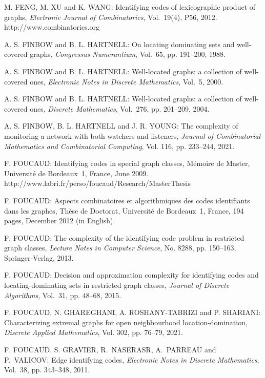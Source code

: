 \begin{thebibliography}{999}
M. FENG, M. XU and K. WANG: Identifying codes of lexicographic product of graphs, {\it Electronic Journal of Combinatorics}, Vol.~19(4), P56, 2012.\\
http://www.combinatorics.org

A. S. FINBOW and B. L. HARTNELL: On locating dominating sets and well-covered graphs, {\it Congressus Numerantium}, Vol.~65, pp. 191--200, 1988.

A. S. FINBOW and B. L. HARTNELL: Well-located graphs: a collection of well-covered ones, {\it Electronic Notes in Discrete Mathematics}, Vol.~5, 2000.

A. S. FINBOW and B. L. HARTNELL: Well-located graphs: a collection of well-covered ones, {\it Discrete Mathematics}, Vol.~276, pp. 201--209, 2004.

A. S. FINBOW, B. L. HARTNELL and J. R. YOUNG: The complexity of monitoring a network with both watchers and listeners, {\it Journal of Combinatorial Mathematics and Combinatorial Computing}, Vol. 116, pp. 233--244, 2021.

F. FOUCAUD: Identifying codes in special graph classes, M\'emoire de Master, Universit\'e de Bordeaux~1, France, June 2009.\\http://www.labri.fr/perso/foucaud/Research/MasterThesis

F. FOUCAUD: Aspects combinatoires et algorithmiques des codes identifiants dans les graphes, Th\`ese de Doctorat, Universit\'e de Bordeaux~1, France, 194 pages, December 2012 (in English).

F. FOUCAUD: The complexity of the  identifying code problem in restricted graph classes, {\it Lecture Notes in Computer Science}, No. 8288, pp. 150--163, Springer-Verlag, 2013.

F. FOUCAUD: Decision and approximation complexity for identifying codes and locating-dominating sets in restricted graph classes, {\it Journal of Discrete Algorithms}, Vol.~31, pp. 48--68, 2015.

F. FOUCAUD, N. GHAREGHANI, A. ROSHANY-TABRIZI and P. SHARIANI: Characterizing extremal graphs for open neighbourhood location-domination, {\it Discrete Applied Mathematics}, Vol. 302, pp. 76--79, 2021.

F. FOUCAUD, S. GRAVIER, R.~NASERASR, A.~PARREAU and P.~VALICOV: Edge identifying codes, {\it Electronic Notes in Discrete Mathematics}, Vol.~38, pp. 343--348, 2011. 


\end{thebibliography}
